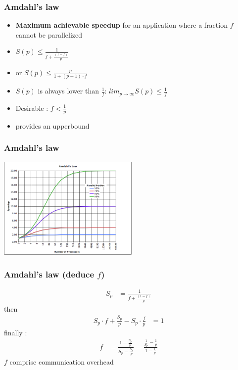 \begin{frame}[containsverbatim]
\frametitle{Amdahl's law}
\begin{itemize}
	\item{\textbf{Maximum achievable speedup} for an application where a fraction $f$ cannot be parallelized}
	\item{$S(p)  \leqslant  \frac{1}{f + \frac{(1-f)}{p}}$}
	\item{or $S(p)  \leqslant  \frac{p}{1 + (p-1) \cdot f}$}
	\item{$S(p)$ is always lower than $\frac{1}{f}$: $lim_{p \rightarrow \infty} S(p)  \leqslant \frac{1}{f}$}
	\item{Desirable : $f < \frac{1}{p}$}
	\item{provides an upperbound}
\end{itemize}
\end{frame}

\begin{frame}[containsverbatim]
\frametitle{Amdahl's law}
\begin{center}
        {\includegraphics[height=5cm]{Day0/images/amdahl.png}}
\end{center}
\end{frame}


\begin{frame}[containsverbatim]
\frametitle{Amdahl's law (deduce $f$)}
\begin{align} 
S_p &= \frac{1}{f + \frac{(1-f)}{p}}
\end{align}
then 
\begin{align} 
S_p \cdot f + \frac{S_p}{p} - S_p \cdot \frac{f}{p} &= 1 
\end{align}
finally :
\begin{align} 
f &= \frac{1 - \frac{S_p}{p}}{S_p - \frac{S_p}{p}} = \frac{\frac{1}{S_p} - \frac{1}{p}}{1 - \frac{1}{p}}
\end{align}
$f$ comprise communication overhead
\end{frame}

